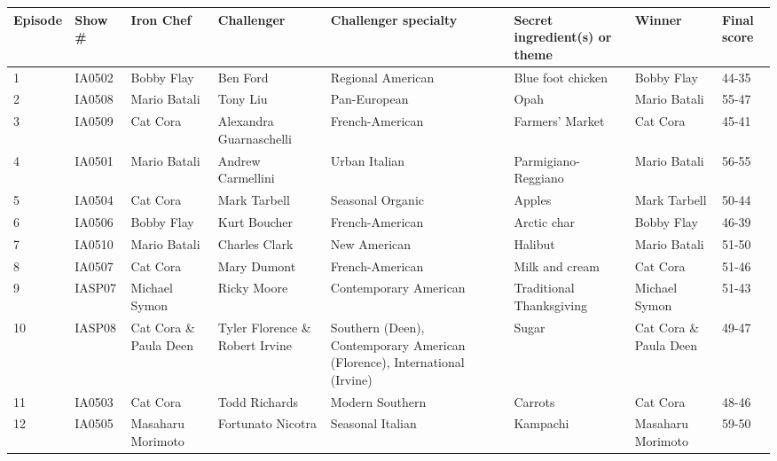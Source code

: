 \documentclass{article}
\begin{document}
\begin{tabular}{llllllll}
\toprule
Episode & Show \# & Iron Chef & Challenger & Challenger specialty & Secret ingredient(s) or theme & Winner & Final score \\
\midrule
1 & IA0502 & Bobby Flay & Ben Ford & Regional American & Blue foot chicken & Bobby Flay & 44-35 \\
2 & IA0508 & Mario Batali & Tony Liu & Pan-European & Opah & Mario Batali & 55-47 \\
3 & IA0509 & Cat Cora & Alexandra Guarnaschelli & French-American & Farmers' Market & Cat Cora & 45-41 \\
4 & IA0501 & Mario Batali & Andrew Carmellini & Urban Italian & Parmigiano-Reggiano & Mario Batali & 56-55 \\
5 & IA0504 & Cat Cora & Mark Tarbell & Seasonal Organic & Apples & Mark Tarbell & 50-44 \\
6 & IA0506 & Bobby Flay & Kurt Boucher & French-American & Arctic char & Bobby Flay & 46-39 \\
7 & IA0510 & Mario Batali & Charles Clark & New American & Halibut & Mario Batali & 51-50 \\
8 & IA0507 & Cat Cora & Mary Dumont & French-American & Milk and cream & Cat Cora & 51-46 \\
9 & IASP07 & Michael Symon & Ricky Moore & Contemporary American & Traditional Thanksgiving & Michael Symon & 51-43 \\
10 & IASP08 & Cat Cora \& Paula Deen & Tyler Florence \& Robert Irvine & Southern (Deen), Contemporary American (Florence), International (Irvine) & Sugar & Cat Cora \& Paula Deen & 49-47 \\
11 & IA0503 & Cat Cora & Todd Richards & Modern Southern & Carrots & Cat Cora & 48-46 \\
12 & IA0505 & Masaharu Morimoto & Fortunato Nicotra & Seasonal Italian & Kampachi & Masaharu Morimoto & 59-50 \\
\bottomrule
\end{tabular}
\end{document}
